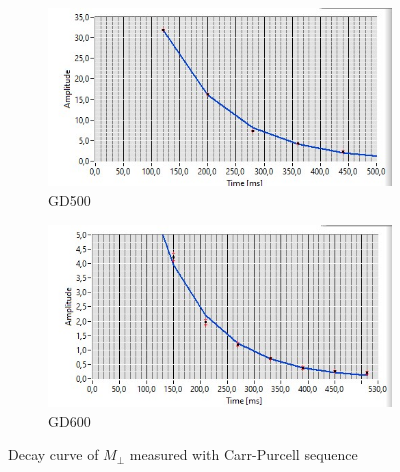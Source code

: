 \begin{figure}[!htbp]
  \centering
  \begin{subfigure}[b]{0.45\textwidth}
    \centering
    \includegraphics[width=\textwidth]{./Protocol images/GD500_T2_cp_fit.jpg}
    \caption{GD500}
    \label{fig:GD500 T2 CP}
  \end{subfigure}
  \hfill
  \begin{subfigure}[b]{0.45\textwidth}
    \centering
    \includegraphics[width=\textwidth]{./Protocol images/GD600_CP_fit (1).jpg}
    \caption{GD600}
    \label{fig:GD600 T2 CP}
  \end{subfigure}
  \caption{Decay curve of $M_\perp$ measured with Carr-Purcell sequence}
  \label{fig:subsidebyside}
\end{figure}

